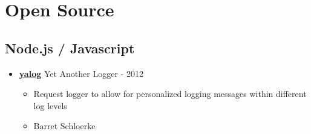 \documentclass[oneside]{article}
\begin{document}


\section{Open Source}
  
  \subsection{Node.js / Javascript}
  
    \begin{itemize}
      \item {\bf \href{http://github.com/schloerke/yalog}{yalog}} Yet Another Logger - 2012
        \begin{itemize}
          \item Request logger to allow for personalized logging messages within different log levels
          \item Barret Schloerke
        \end{itemize}
    \end{itemize}
  
\end{document}
